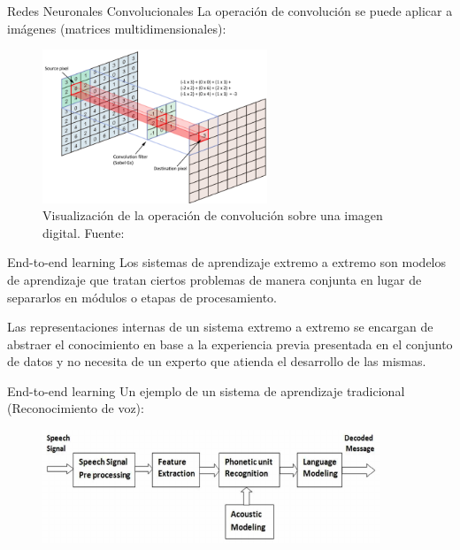 \documentclass[10pt]{beamer}
\begin{document}
\begin{frame}{Redes Neuronales Convolucionales}
    La operación de convolución se puede aplicar a imágenes (matrices multidimensionales):

    \begin{figure}[!h] 
        \centering
        \includegraphics[width=0.60\textwidth]{../img/convolucion}
        \caption[Visualización de la operación de convolución sobre una imagen digital]{Visualización de la operación de convolución sobre una imagen digital. Fuente: \cite{cornelisse_2018} }
    \end{figure}
\end{frame}

\begin{frame}{End-to-end learning}
    Los sistemas de aprendizaje extremo a extremo son modelos de aprendizaje que tratan ciertos problemas 
    \alert{de manera conjunta} en lugar de separarlos en módulos o etapas de procesamiento.

    Las representaciones internas de un sistema extremo a extremo se encargan de abstraer el conocimiento en 
    base a la experiencia previa presentada en el conjunto de datos y no necesita de un experto que atienda 
    el desarrollo de las mismas.

\end{frame}

\begin{frame}{End-to-end learning}
    Un ejemplo de un sistema de aprendizaje tradicional (Reconocimiento de voz):

    \begin{figure}[!h] 
        \centering
        \includegraphics[width=0.90\textwidth]{../img/voice}
    \end{figure}
\end{frame}
\end{document}
